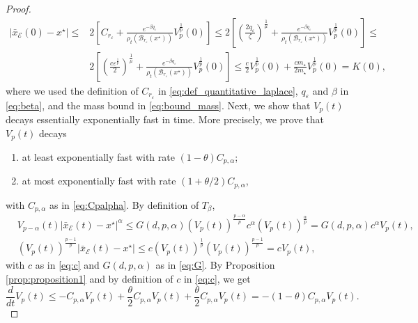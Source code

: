 \documentclass[11pt,handout]{article}%
\numberwithin{equation}{section}
\theoremstyle{definition}
\begin{document}
\begin{proof}
\begin{equation*}
		\begin{split}
			\vert \bar{x}_\mathcal{E}(0)-x^\star \vert \leq & 2 \left[ C_{r_\varepsilon} +   \frac{e^{-\beta q_\varepsilon}}{\rho_t(\mathcal{B}_{r_\varepsilon}(x^\star))} V_p^{\frac{1}{p}}(0) \right] \leq  2 \left[ \left( \frac{2q_\varepsilon}{\zeta}\right)^{\frac{1}{\mu}} +   \frac{e^{-\beta q_\varepsilon}}{\rho_t(\mathcal{B}_{r_\varepsilon}(x^\star))} V_p^{\frac{1}{p}}(0) \right]\leq \\
			&  2 \left[ \left( \frac{c \varepsilon^{\frac{1}{p}}  }{2}\right)^{\frac{1}{\mu}} +   \frac{e^{-\beta q_\varepsilon}}{\rho_t(\mathcal{B}_{r_\varepsilon}(x^\star))} V_p^{\frac{1}{p}}(0) \right]\leq \frac{c}{2}  V_p^{\frac{1}{p}}(0) + \frac{c m_\star}{2 m_\star} V_p^{\frac{1}{p}}(0)= K(0),
		\end{split}
	\end{equation*}
	where we used the definition of $C_{r_\varepsilon}$ in \eqref{eq:def_quantitative_laplace}, $q_\varepsilon$ and $\beta$ in \eqref{eq:beta}, and the mass bound in \eqref{eq:bound_mass}. Next, we show that $V_p(t)$ decays essentially exponentially fast in time. More precisely, we prove that $V_p(t)$ decays 
	\begin{enumerate}
		\item at least exponentially fast with rate $(1-\theta)C_{p,\alpha}$;
		\item at most exponentially fast with rate $(1+\theta/2)C_{p,\alpha}$,
	\end{enumerate}
	with $C_{p,\alpha}$ as in \eqref{eq:Cpalpha}. By definition of $T_\beta$,
	\begin{equation*}
		\begin{split}
			&V_{p-\alpha}(t) \vert \bar{x}_\mathcal{E}(t)-x^\star \vert^\alpha \leq G(d,p,\alpha) (V_p(t))^{\frac{p-\alpha}{p}} c^\alpha(V_p(t))^{\frac{\alpha}{p}} =  G(d,p,\alpha) c^\alpha V_p(t),  \\
			&(V_p(t))^{\frac{p-1}{p}} \vert \bar{x}_\mathcal{E}(t)-x^\star \vert \leq c (V_p(t))^{\frac{1}{p}} (V_p(t))^{\frac{p-1}{p}} = c V_p(t),
		\end{split}
	\end{equation*}
	with $c$ as in \eqref{eq:c} and $G(d,p,\alpha)$ as in \eqref{eq:G}.  By Proposition \ref{prop:proposition1} and by definition of $c$ in \eqref{eq:c}, we get  
	\begin{equation*}
		\frac{d}{dt} V_p(t) \leq -C_{p,\alpha} V_p(t) + \frac{\theta}{2} C_{p,\alpha}  V_p(t) + \frac{\theta}{2} C_{p,\alpha}  V_p(t) = -(1-\theta) C_{p,\alpha}  V_p(t). 
	\end{equation*}

\end{proof}
\end{document}
